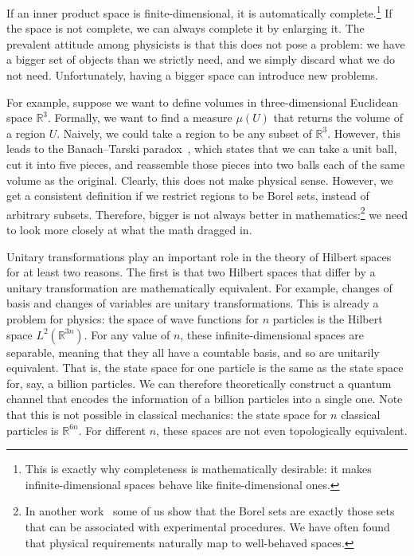 \documentclass[10pt,twocolumn, nofootinbib]{revtex4-2}
\begin{document}
If an inner product space is finite-dimensional, it is automatically complete.\footnote{This is exactly why completeness is mathematically desirable: it makes infinite-dimensional spaces behave like finite-dimensional ones.} If the space is not complete, we can always complete it by enlarging it. The prevalent attitude among physicists is that this does not pose a problem: we have a bigger set of objects than we strictly need, and we simply discard what we do not need. Unfortunately, having a bigger space can introduce new problems.

For example, suppose we want to define volumes in three-dimensional Euclidean space $\mathbb{R}^3$. Formally, we want to find a measure $\mu(U)$ that returns the volume of a region $U$. Naively, we could take a region to be any subset of $\mathbb{R}^3$. However, this leads to the Banach–Tarski paradox~\cite{tao2021introduction}, which states that we can take a unit ball, cut it into five pieces, and reassemble those pieces into two balls each of the same volume as the original. Clearly, this does not make physical sense. However, we get a consistent definition if we restrict regions to be Borel sets, instead of arbitrary subsets. Therefore, bigger is not always better in mathematics:\footnote{In another work~\cite{aop-book} some of us show that the Borel sets are exactly those sets that can be associated with experimental procedures. We have often found that physical requirements naturally map to well-behaved spaces.} we need to look more closely at what the math dragged in.

Unitary transformations play an important role in the theory of Hilbert spaces for at least two reasons. The first is that two Hilbert spaces that differ by a unitary transformation are mathematically equivalent. For example, changes of basis and changes of variables are unitary transformations. This is already a problem for physics: the space of wave functions for $n$ particles is the Hilbert space $L^2(\mathbb{R}^{3n})$. For any value of $n$, these infinite-dimensional spaces are separable, meaning that they all have a countable basis, and so are unitarily equivalent. That is, the state space for one particle is the same as the state space for, say, a billion particles. We can therefore theoretically construct a quantum channel that encodes the information of a billion particles into a single one. Note that this is not possible in classical mechanics: the state space for $n$ classical particles is $\mathbb{R}^{6n}$. For different $n$, these spaces are not even topologically equivalent.
\end{document}
